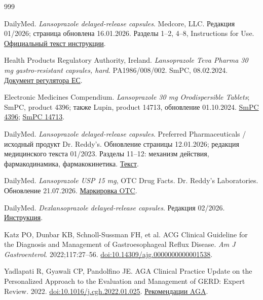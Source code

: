 \documentclass[11pt,a4paper,notitlepage]{report}
\begin{document}
\begin{thebibliography}{999}
\small
\raggedright

 DailyMed. \textit{Lansoprazole delayed-release capsules}. Medcore, LLC. Редакция 01/2026; страница обновлена 16.01.2026. Разделы 1--2, 4--8, Instructions for Use. \href{https://dailymed.nlm.nih.gov/dailymed/lookup.cfm?setid=18b4020f-d7e6-42f8-838d-2b5da152530e}{Официальный текст инструкции}.

 Health Products Regulatory Authority, Ireland. \textit{Lansoprazole Teva Pharma 30 mg gastro-resistant capsules, hard}. PA1986/008/002. SmPC, 08.02.2024. \href{https://assets.hpra.ie/products/Human/29860/Licence_PA1986-008-002_08022024114836.pdf}{Документ регулятора ЕС}.

 Electronic Medicines Compendium. \textit{Lansoprazole 30 mg Orodispersible Tablets}; SmPC, product 4396; также Lupin, product 14713, обновление 01.10.2024. \href{https://www.medicines.org.uk/emc/product/4396/smpc}{SmPC 4396}; \href{https://www.medicines.org.uk/emc/product/14713/smpc}{SmPC 14713}.

 DailyMed. \textit{Lansoprazole delayed-release capsules}. Preferred Pharmaceuticals / исходный продукт Dr. Reddy's. Обновление страницы 12.01.2026; редакция медицинского текста 01/2023. Разделы 11--12: механизм действия, фармакодинамика, фармакокинетика. \href{https://dailymed.nlm.nih.gov/dailymed/lookup.cfm?setid=960d6601-aec5-4900-a400-385b6687a4bc}{Текст}.





 DailyMed. \textit{Lansoprazole USP 15 mg}, OTC Drug Facts. Dr. Reddy's Laboratories. Обновление 21.07.2026. \href{https://www.dailymed.nlm.nih.gov/dailymed/drugInfo.cfm?setid=4a701c0d-fef5-aa12-01e6-e3680a161a7d}{Маркировка OTC}.

 DailyMed. \textit{Dexlansoprazole delayed-release capsules}. Редакция 02/2026. \href{https://www.dailymed.nlm.nih.gov/dailymed/drugInfo.cfm?setid=31d3d485-5f87-4405-b940-490fa4ccf9cc}{Инструкция}.

 Katz PO, Dunbar KB, Schnoll-Sussman FH, et al. ACG Clinical Guideline for the Diagnosis and Management of Gastroesophageal Reflux Disease. \textit{Am J Gastroenterol}. 2022;117:27--56. \href{https://doi.org/10.14309/ajg.0000000000001538}{doi:10.14309/ajg.0000000000001538}.

 Yadlapati R, Gyawali CP, Pandolfino JE. AGA Clinical Practice Update on the Personalized Approach to the Evaluation and Management of GERD: Expert Review. 2022. \href{https://doi.org/10.1016/j.cgh.2022.01.025}{doi:10.1016/j.cgh.2022.01.025}. \href{https://gastro.org/clinical-guidance/personalized-approach-to-the-evaluation-and-management-of-gastroesophageal-reflux-disease-gerd/}{Рекомендации AGA}.


\end{thebibliography}
\end{document}
